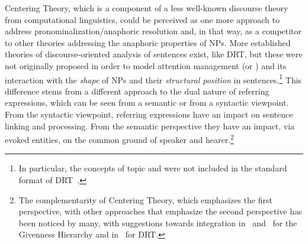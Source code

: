 \documentclass[output=paper
,modfonts
,nonflat]{langsci/langscibook}
\begin{document}
Centering Theory, which is a component of a less well-known discourse theory from computational linguistics, could be perceived as one more approach to address pronominalization/anaphoric resolution and, in that way, as a competitor to other theories addressing the anaphoric properties of NPs. More established theories of discourse-oriented analysis of sentences exist, like DRT, but these were not originally proposed in order to model attention management (or ) and its interaction with the \textit{shape} of NPs and their \textit{structural position} in sentences.\footnote{In particular, the concepts of topic and  were not included in the standard format of DRT~\citep[see][360, 639]{KampReyle1993}.} This difference stems from a different approach to the dual nature of referring expressions, which can be seen from a semantic or from a syntactic viewpoint. From the syntactic viewpoint, referring expressions have an impact on sentence linking and processing. From the semantic perspective they have an impact, via evoked entities, on the common ground of speaker and hearer.\footnote{The complementarity of Centering Theory, which emphasizes the first perspective, with other approaches that emphasize the second perspective has been noticed by many, with suggestions towards integration in~\citet{WalkerPrince1996} and~\citet{Gundel1998} for the Givenness Hierarchy and in~\citet{Roberts1998place,Roberts2012} for DRT.} 
\end{document}
